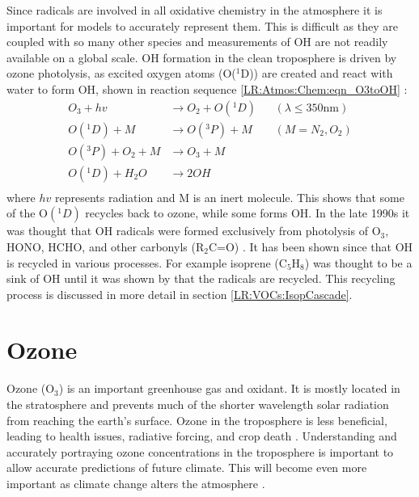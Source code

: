     Since radicals are involved in all oxidative chemistry in the atmosphere it is important for models to accurately represent them. 
    This is difficult as they are coupled with so many other species and measurements of OH are not readily available on a global scale.
    OH formation in the clean troposphere is driven by ozone photolysis, as excited oxygen atoms (O(${}^1$D)) are created and react with water to form OH, shown in reaction sequence \ref{LR:Atmos:Chem:eqn_O3toOH} 
    \parencite{Atkinson2000, AtkinsonArey2003}:
    \begin{equation}
    \begin{aligned}
    O_3+hv            & \to  O_2 + O({}^1D)   && (\lambda \le 350 \text{nm}) \\%
    O({}^1D)+M        & \to  O({}^3P) + M     && (M=N_2, O_2)               \\%
    O({}^3P)+O_2 + M  & \to  O_3 + M          &&                           \\%
    O({}^1D)+H_2O     & \to  2OH              &&                            \\%
    \end{aligned}
    \label{LR:Atmos:Chem:eqn_O3toOH}
    \end{equation}
    where $hv$ represents radiation and M is an inert molecule.
    This shows that some of the O$({}^1D)$ recycles back to ozone, while some 
    forms OH.
    In the late 1990s it was thought that OH radicals were formed exclusively 
    from photolysis of O$_3$, HONO, HCHO, and other carbonyls (R$_2$C=O) 
    \parencite{Atkinson2000}.
    It has been shown since that OH is recycled in various processes.
    For example isoprene (C$_5$H$_8$) was thought to be a sink of OH until it 
    was shown by \textcite{Paulot2009b} that the radicals are recycled.
    This recycling process is discussed in more detail in section \ref{LR:VOCs:IsopCascade}.
    
    
      
\section{Ozone}
\label{LR:O3}
  
  Ozone (O$_3$) is an important greenhouse gas and oxidant.
  It is mostly located in the stratosphere and prevents much of the shorter wavelength solar radiation from reaching the earth's surface.
  Ozone in the troposphere is less beneficial, leading to health issues, 
  radiative forcing, and crop death \parencite{Stevenson2013}.
  Understanding and accurately portraying ozone concentrations in the troposphere is important to allow accurate predictions of future climate.
  This will become even more important as climate change alters the atmosphere 
  \parencite{Hegglin2009}.
  
